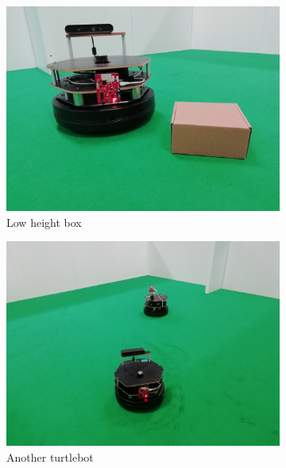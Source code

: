 \begin{figure}[ht!]
\begin{subfigure}[b]{0.3\linewidth}
    \includegraphics[width=\linewidth]{imgs/chapter5/box.jpg}
    \caption{Low height box}
    \label{fig::box}
  \end{subfigure}
  \begin{subfigure}[b]{0.3\linewidth}
    \includegraphics[width=\linewidth]{imgs/chapter5/robot.jpg}
    \caption{Another turtlebot}
    \label{fig::robot}
  \end{subfigure}
  \begin{subfigure}[b]{0.3\linewidth}

\end{subfigure}
\end{figure}
